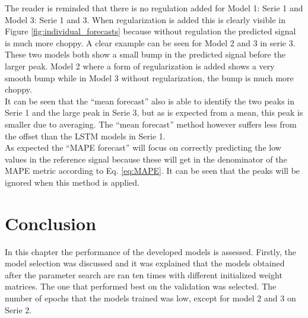 The reader is reminded that there is no regulation added for Model 1: Serie 1 and Model 3: Serie 1 and 3. When regularization is added this is clearly visible in Figure \ref{fig:individual_forecasts} because without regulation the predicted signal is much more choppy. A clear example can be seen for Model 2 and 3 in serie 3. These two models both show a small bump in the predicted signal before the larger peak. Model 2 where a form of regularization is added shows a very smooth bump while in Model 3 without regularization, the bump is much more choppy. \\

It can be seen that the ``mean forecast'' also is able to identify the two peaks in Serie 1 and the large peak in Serie 3, but as is expected from a mean, this peak is smaller due to averaging. The ``mean forecast'' method however suffers less from the offset than the LSTM models in Serie 1.\\

As expected the ``MAPE forecast'' will focus on correctly predicting the low values in the reference signal because these will get in the denominator of the MAPE metric according to Eq. \ref{eq:MAPE}. It can be seen that the peaks will be ignored when this method is applied. 

\section{Conclusion}
In this chapter the performance of the developed models is assessed. Firstly, the model selection was discussed and it was explained that the models obtained after the parameter search are ran ten times with different initialized weight matrices. The one that performed best on the validation was selected. The number of epochs that the models trained was low, except for model 2 and 3 on Serie 2.\\


